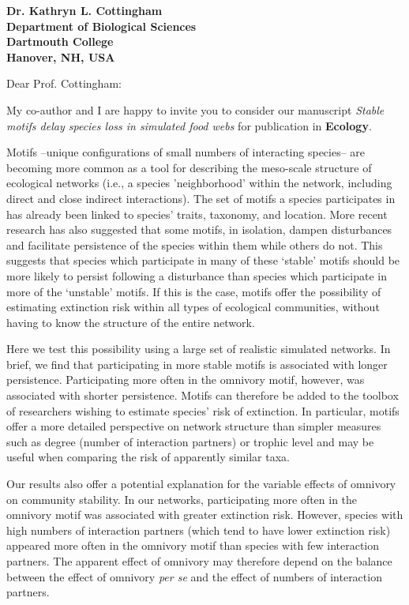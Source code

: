 \documentclass[12pt]{letter}
\begin{document}
\begin{letter}{\bf Dr. Kathryn L. Cottingham \\
Department of Biological Sciences \\
Dartmouth College \\
Hanover, NH, USA}


\opening{Dear Prof. Cottingham:}

  My co-author and I are happy to invite you to consider our manuscript
  \emph{Stable motifs delay species loss in simulated food webs} for publication in \textbf{Ecology}.


	Motifs --unique configurations of small numbers of interacting species-- are becoming more common as a tool for describing the meso-scale structure of ecological networks (i.e., a species 'neighborhood' within the network, including direct and close indirect interactions). 
	The set of motifs a species participates in has already been linked to species' traits, taxonomy, and location.
	More recent research has also suggested that some motifs, in isolation, dampen disturbances and facilitate persistence of the species within them while others do not.
	This suggests that species which participate in many of these `stable' motifs should be more likely to persist following a disturbance than species which participate in more of the `unstable' motifs.
	If this is the case, motifs offer the possibility of estimating extinction risk within all types of ecological communities, without having to know the structure of the entire network.


	Here we test this possibility using a large set of realistic simulated networks. In brief, we find that participating in more stable motifs is associated with longer persistence. Participating more often in the omnivory motif, however, was associated with shorter persistence. Motifs can therefore be added to the toolbox of researchers wishing to estimate species' risk of extinction. In particular, motifs offer a more detailed perspective on network structure than simpler measures such as degree (number of interaction partners) or trophic level and may be useful when comparing the risk of apparently similar taxa.


 	Our results also offer a potential explanation for the variable effects of omnivory on community stability. In our networks, participating more often in the omnivory motif was associated with greater extinction risk. However, species with high numbers of interaction partners (which tend to have lower extinction risk) appeared more often in the omnivory motif than species with few interaction partners. The apparent effect of omnivory may therefore depend on the balance between the effect of omnivory \emph{per se} and the effect of numbers of interaction partners.



\end{letter}
\end{document}
